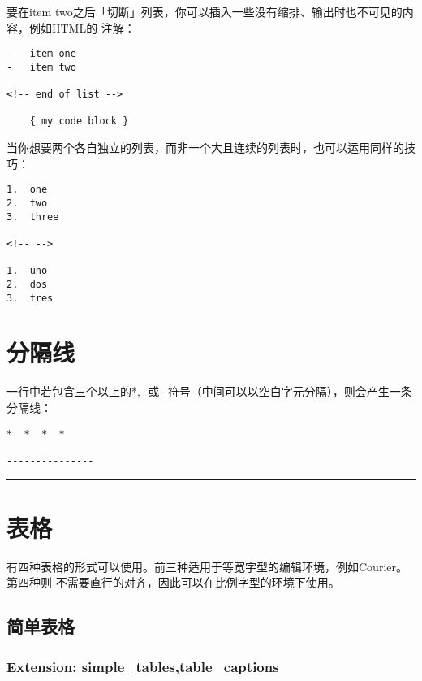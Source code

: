 \documentclass[fancyhdr,bookmark]{ctexbook}
\begin{document}
要在item
two之后「切断」列表，你可以插入一些没有缩排、输出时也不可见的内容，例如HTML的
注解：

\begin{lstlisting}
-   item one
-   item two

<!-- end of list -->

    { my code block }
\end{lstlisting}

当你想要两个各自独立的列表，而非一个大且连续的列表时，也可以运用同样的技巧：

\begin{lstlisting}
1.  one
2.  two
3.  three

<!-- -->

1.  uno
2.  dos
3.  tres
\end{lstlisting}

\section{分隔线}\label{ux5206ux9694ux7ebf}

一行中若包含三个以上的*,
-或\_符号（中间可以以空白字元分隔），则会产生一条分隔线：

\begin{lstlisting}
*  *  *  *

---------------
\end{lstlisting}

\begin{center}\rule{0.5\linewidth}{\linethickness}\end{center}

\section{表格}\label{ux8868ux683c}

有四种表格的形式可以使用。前三种适用于等宽字型的编辑环境，例如Courier。第四种则
不需要直行的对齐，因此可以在比例字型的环境下使用。

\subsection{简单表格}\label{ux7b80ux5355ux8868ux683c}

\subsubsection{Extension:
simple\_tables,table\_captions}\label{extension-simpleux5ftablestableux5fcaptions}
\end{document}
